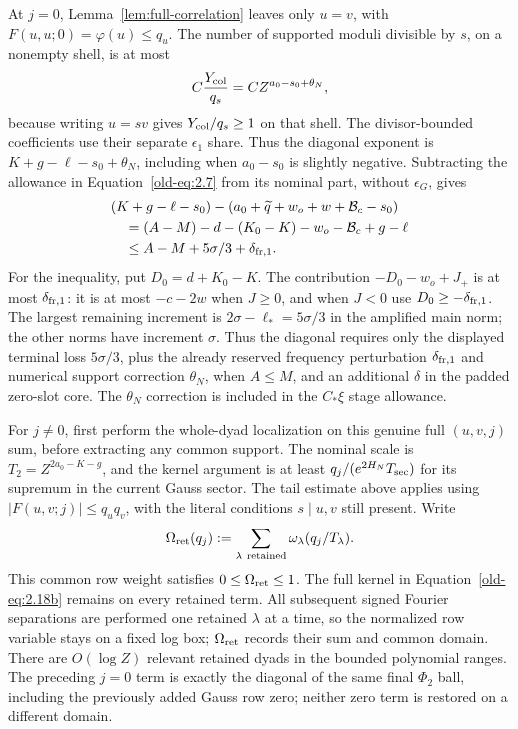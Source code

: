 \documentclass[12pt]{article}
\begin{document}
At \(j=0\), Lemma~\ref{lem:full-correlation} leaves only \(u=v\),
with \(F(u,u;0)=\varphi(u)\le q_u\).  The number of supported
moduli divisible by \(s\), on a nonempty shell, is at most
\[
 C\frac{Y_{\rm col}}{q_s}=C Z^{a_0-s_0+\theta_N},
\]
because writing \(u=sv\) gives \(Y_{\rm col}/q_s\ge1\) on that shell.
The divisor-bounded coefficients use their separate \(\epsilon_1\)
share.  Thus the diagonal exponent is
\(K+g-\ell-s_0+\theta_N\), including when \(a_0-s_0\) is slightly
negative.  Subtracting the allowance in Equation~\eqref{old-eq:2.7}
from its nominal part, without \(\epsilon_G\), gives
\begin{equation}
 \begin{split}
 &(K+g-\ell-s_0)
 -(a_0+\widetilde q+w_o+w+\mathcal B_c-s_0)\\
 &\quad=(A-M)-d-(K_0-K)-w_o-\mathcal B_c+g-\ell\\
 &\quad\le A-M+5\sigma/3+\delta_{{\rm fr},1}.
 \end{split}
 \label{old-eq:2.12}
\end{equation}
For the inequality, put \(D_0=d+K_0-K\).  The contribution
\(-D_0-w_o+J_+\) is at most \(\delta_{{\rm fr},1}\): it is at most
\(-c-2w\) when \(J\ge0\), and when \(J<0\) use
\(D_0\ge-\delta_{{\rm fr},1}\).
The largest remaining increment is
\(2\sigma-\ell_*=5\sigma/3\) in the amplified main norm;
the other norms have increment \(\sigma\).  Thus the diagonal
requires only the displayed terminal loss \(5\sigma/3\), plus
the already reserved frequency perturbation \(\delta_{{\rm fr},1}\)
and numerical support correction \(\theta_N\), when \(A\le M\),
and an additional \(\delta\) in the padded zero-slot core.  The
\(\theta_N\) correction is included in the \(C_*\xi\) stage allowance.

For \(j\ne0\), first perform the whole-dyad localization on this
genuine full \((u,v,j)\) sum, before extracting any common support.
The nominal scale is
\(T_2=Z^{2a_0-K-g}\), and the kernel argument is at least
\(q_j/(e^{2H_N}T_{\rm sec})\) for its supremum in the current
Gauss sector.  The tail estimate above applies using
\(|F(u,v;j)|\le q_uq_v\), with the literal conditions
\(s\mid u,v\) still present.  Write
\[
 \Omega_{\rm ret}(q_j)
 :=\sum_{\lambda\ {\rm retained}}\omega_\lambda(q_j/T_\lambda).
\]
This common row weight satisfies \(0\le\Omega_{\rm ret}\le1\).
The full kernel in Equation~\eqref{old-eq:2.18b} remains on every
retained term.  All subsequent signed Fourier separations are performed
one retained \(\lambda\) at a time, so the normalized row variable
stays on a fixed log box; \(\Omega_{\rm ret}\) records their sum and
common domain.  There are \(O(\log Z)\) relevant retained dyads in
the bounded polynomial ranges.  The preceding \(j=0\) term is exactly the diagonal
of the same final \(\Phi_2\) ball, including the previously added
Gauss row zero; neither zero term is restored on a different domain.
\end{document}
